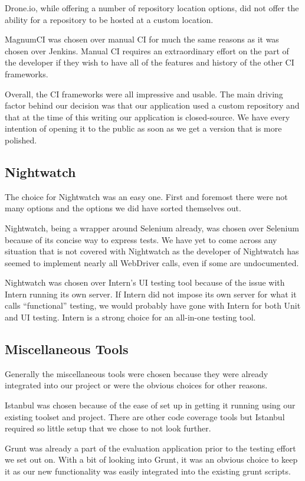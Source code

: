 \documentclass[12pt]{ucthesis}
\begin{document}
Drone.io, while offering a number of repository location options, did not offer the ability for a repository to be hosted at a custom location.

MagnumCI was chosen over manual CI for much the same reasons as it was chosen over Jenkins. Manual CI requires an extraordinary effort on the part of the developer if they wish to have all of the features and history of the other CI frameworks.

Overall, the CI frameworks were all impressive and usable. The main driving factor behind our decision was that our application used a custom repository and that at the time of this writing our application is closed-source. We have every intention of opening it to the public as soon as we get a version that is more polished.

\subsection{Nightwatch}
The choice for Nightwatch was an easy one. First and foremost there were not many options and the options we did have sorted themselves out.

Nightwatch, being a wrapper around Selenium already, was chosen over Selenium because of its concise way to express tests. We have yet to come across any situation that is not covered with Nightwatch as the developer of Nightwatch has seemed to implement nearly all WebDriver calls, even if some are undocumented.

Nightwatch was chosen over Intern's UI testing tool because of the issue with Intern running its own server. If Intern did not impose its own server for what it calls ``functional'' testing, we would probably have gone with Intern for both Unit and UI testing. Intern is a strong choice for an all-in-one testing tool.

\subsection{Miscellaneous Tools}
Generally the miscellaneous tools were chosen because they were already integrated into our project or were the obvious choices for other reasons.

Istanbul was chosen because of the ease of set up in getting it running using our existing toolset and project. There are other code coverage tools but Istanbul required so little setup that we chose to not look further.

Grunt was already a part of the evaluation application prior to the testing effort we set out on. With a bit of looking into Grunt, it was an obvious choice to keep it as our new functionality was easily integrated into the existing grunt scripts.
\end{document}
